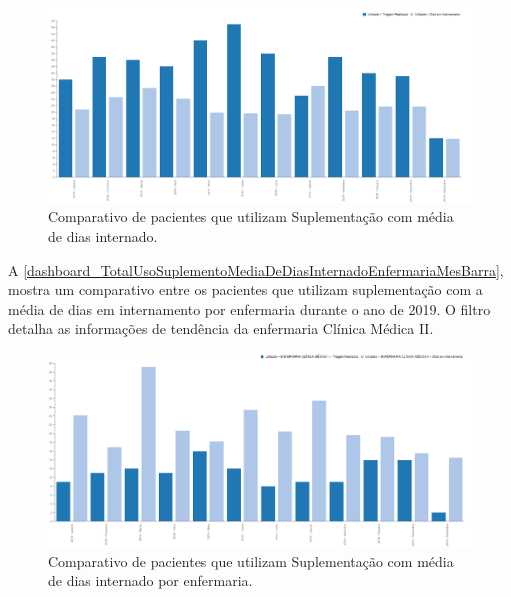 \begin{figure}[htb]
	\caption{\label{dashboard_TotalUsoSuplementoMediaDeDiasInternadoHospitalMesBarra}Comparativo de pacientes que utilizam Suplementação com média de dias internado.}
	\begin{center}
	    \includegraphics[scale=0.46]{Imagens/6.1.TotalUsoSuplementoMediaDeDiasInternadoHospitalMesBarra.png}
	\end{center}
\end{figure}

A \autoref{dashboard_TotalUsoSuplementoMediaDeDiasInternadoEnfermariaMesBarra}, mostra um comparativo entre os pacientes que utilizam suplementação com a média de dias em internamento por enfermaria durante o ano de 2019. O filtro detalha as informações de tendência da enfermaria Clínica Médica II.

\begin{figure}[htb]
	\caption{\label{dashboard_TotalUsoSuplementoMediaDeDiasInternadoEnfermariaMesBarra}Comparativo de pacientes que utilizam Suplementação com média de dias internado por
enfermaria.}
	\begin{center}
	    \includegraphics[scale=0.46]{Imagens/6.2.TotalUsoSuplementoMediaDeDiasInternadoEnfermariaMesBarra.png}
	\end{center}
\end{figure}

